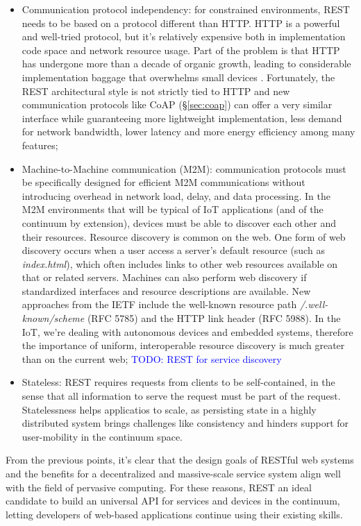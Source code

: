\begin{itemize}
    \item Communication protocol independency: for constrained environments, REST needs to be based on a protocol different than HTTP. HTTP is a powerful and well-tried protocol, but it's relatively expensive both in implementation code space and network resource usage. Part of the problem is that HTTP has undergone more than a decade of organic growth, leading to considerable implementation baggage that overwhelms small devices \cite{coap}. Fortunately, the REST architectural style is not strictly tied to HTTP and new communication protocols like CoAP (§\ref{sec:coap}) can offer a very similar interface while guaranteeing more lightweight implementation, less demand for network bandwidth, lower latency and more energy efficiency among many features;
    \item Machine-to-Machine communication (M2M): communication protocols must be specifically designed for efficient M2M communications without introducing overhead in network load, delay, and data processing. In the M2M environments that will be typical of IoT applications (and of the continuum by extension), devices must be able to discover each other and their resources. Resource discovery is common on the web. One form of web discovery occurs when a user access a server's default resource (such as \emph{index.html}), which often includes links to other web resources available on that or related servers. Machines can also perform web discovery if standardized interfaces and resource descriptions are available. New approaches from the IETF include the well-known resource path \emph{/.well-known/scheme} (RFC 5785) and the HTTP link header (RFC 5988). In the IoT, we're dealing with autonomous devices and embedded systems, therefore the importance of uniform, interoperable resource discovery is much greater than on the current web; \textcolor{blue}{TODO: REST for service discovery}
    \item Stateless: REST requires requests from clients to be self-contained, in the sense that all information to serve the request must be part of the request. Statelessness helps applicatios to scale, as persisting state in a highly distributed system brings challenges like consistency and hinders support for user-mobility in the continuum space.
\end{itemize}

From the previous points, it's clear that the design goals of RESTful web systems and the benefits for a decentralized and massive-scale service system align well with the field of pervasive computing. For these reasons, REST an ideal candidate to build an universal API for services and devices in the continuum, letting developers of web-based applications continue using their existing skills. 

